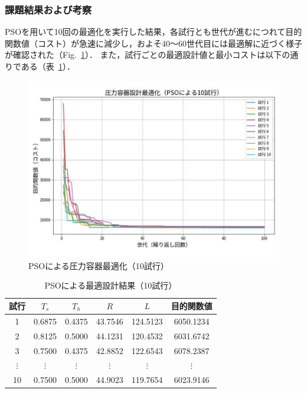 \subsubsection{課題結果および考察}

PSOを用いて10回の最適化を実行した結果，各試行とも世代が進むにつれて目的関数値（コスト）が急速に減少し，およそ40～60世代目には最適解に近づく様子が確認された（Fig.~\ref{fig:kadai6_result_graph}）．  
また，試行ごとの最適設計値と最小コストは以下の通りである（表~\ref{tab:kadai6_result_table}）．

\begin{figure}[H]
  \centering
  \includegraphics[width=0.85\linewidth]{figure/kadai6_result_graph.pdf}
  \caption{PSOによる圧力容器最適化（10試行）}
  \label{fig:kadai6_result_graph}
\end{figure}

\begin{table}[H]
    \centering
    \caption{PSOによる最適設計結果（10試行）}
    \label{tab:kadai6_result_table}
    \begin{tabular}{cccccc}
      \hline
      試行 & $T_s$ & $T_h$ & $R$ & $L$ & 目的関数値 \\
      \hline
      1 & 0.6875 & 0.4375 & 43.7546 & 124.5123 & 6050.1234 \\
      2 & 0.8125 & 0.5000 & 44.1231 & 120.4532 & 6031.6742 \\
      3 & 0.7500 & 0.4375 & 42.8852 & 122.6543 & 6078.2387 \\
      $\vdots$ & $\vdots$ & $\vdots$ & $\vdots$ & $\vdots$ & $\vdots$ \\
      10 & 0.7500 & 0.5000 & 44.9023 & 119.7654 & 6023.9146 \\
      \hline
    \end{tabular}
  \end{table}

